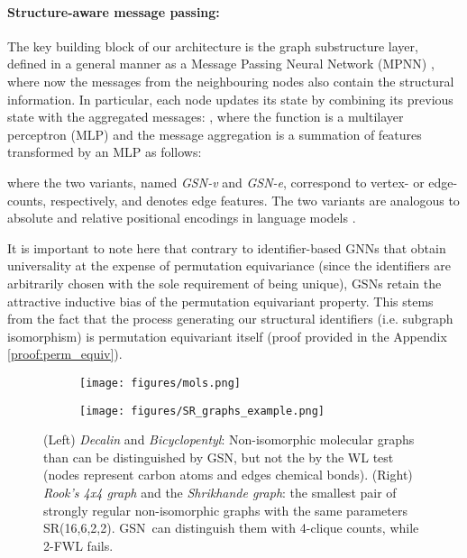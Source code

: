 \documentclass{article} \usepackage{iclr2021_conference,times}
\newcommand{\modelname}{GSN}
\begin{document}
\paragraph{Structure-aware message passing:} The key building block of our architecture is the graph substructure layer, defined in a general manner as a Message Passing Neural Network (MPNN) \citep{gilmer2017neural}, where now the messages from the neighbouring nodes also contain the structural information. In particular, each node  updates its state  by combining its previous state with the aggregated messages: , where the  function is a multilayer perceptron (MLP) and the message aggregation is a summation of features transformed by an MLP  as follows:

where the two variants, named \textit{GSN-v} and \textit{GSN-e}, correspond to vertex- or edge-counts, respectively, and  denotes edge features. The two variants are analogous to absolute and relative positional encodings in language models \citep{DBLP:conf/naacl/ShawUV18, DBLP:conf/acl/DaiYYCLS19}.  

It is important to note here that contrary to identifier-based GNNs \citep{Loukas2020What, sato2020random, clip_ijcai20} that obtain universality at the expense of permutation equivariance (since the identifiers are arbitrarily chosen with the sole requirement of being unique), GSNs retain the attractive inductive bias of the permutation equivariant property. This stems from the fact that the process generating our structural identifiers (i.e. subgraph isomorphism) is permutation equivariant itself (proof provided in the Appendix \ref{proof:perm_equiv}). 




\begin{figure}[t]\vspace{-5mm}
\centering
\begin{subfigure}{0.4\textwidth}
  \centering
  \texttt{[image: figures/mols.png]}
  \label{fig:molecules}
\end{subfigure}
\hspace{1cm}
\begin{subfigure}{0.4\textwidth}
  \centering
     \texttt{[image: figures/SR\_graphs\_example.png]}
\end{subfigure}
    \captionsetup[figure]{skip=\abovecaptionskip}
  \caption{(Left) \emph{Decalin} and \emph{Bicyclopentyl}: Non-isomorphic molecular graphs than can be distinguished by \modelname, but not the by the WL test \citep{sato2020survey} (nodes represent carbon atoms and edges chemical bonds).
  (Right) \emph{Rook's 4x4 graph} and the \emph{Shrikhande graph}: the smallest pair of strongly regular non-isomorphic graphs with the same parameters SR(16,6,2,2). \modelname\ can distinguish them with 4-clique counts, while 2-FWL fails.\vspace{-3mm}}
 \label{fig:graph_examples}
\end{figure}
\end{document}
